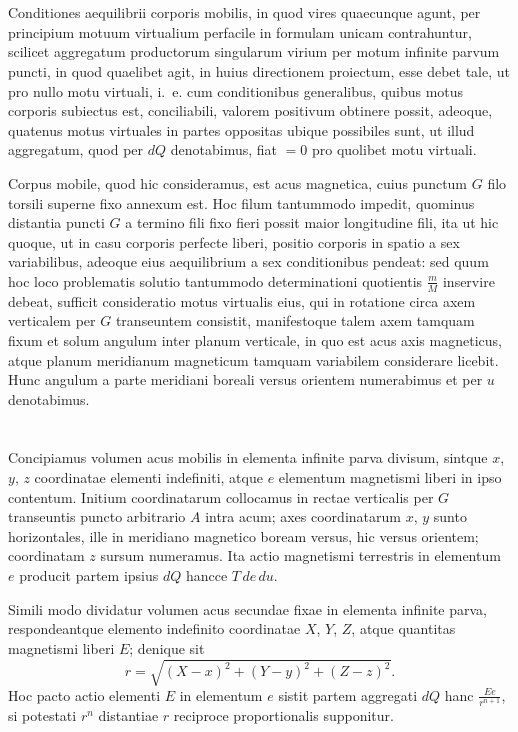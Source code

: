 \documentclass[fontsize=11pt,paper=a4,twoside,openany]{scrbook}
\begin{document}
\section{}

Conditiones aequilibrii corporis mobilis, in quod vires quaecunque agunt, per principium motuum virtualium perfacile in formulam unicam contrahuntur, scilicet aggregatum productorum singularum virium per motum infinite parvum puncti, in quod quaelibet agit, in huius directionem proiectum, esse debet tale, ut pro nullo motu virtuali, i.~e. cum conditionibus generalibus, quibus motus corporis subiectus est, conciliabili, valorem positivum obtinere possit, adeoque, quatenus motus virtuales in partes oppositas ubique possibiles sunt, ut illud aggregatum, quod per $dQ$ denotabimus, fiat $=0$ pro quolibet motu virtuali.

Corpus mobile, quod hic consideramus, est acus magnetica, cuius punctum $G$ filo torsili superne fixo annexum est. Hoc filum tantummodo impedit, quominus distantia puncti $G$ a termino fili fixo fieri possit maior longitudine fili, ita ut hic quoque, ut in casu corporis perfecte liberi, positio corporis in spatio a sex variabilibus, adeoque eius aequilibrium a sex conditionibus pendeat: sed quum hoc loco problematis solutio tantummodo determinationi quotientis $\frac{m}{M}$ inservire debeat, sufficit consideratio motus virtualis eius, qui in rotatione circa axem verticalem per $G$ transeuntem consistit, manifestoque talem axem tamquam fixum et solum angulum inter planum verticale, in quo est acus axis magneticus, atque planum meridianum magneticum tamquam variabilem considerare licebit. Hunc angulum a parte meridiani boreali versus orientem numerabimus et per $u$ denotabimus.

\section{}

Concipiamus volumen acus mobilis in elementa infinite parva divisum, sintque $x$, $y$, $z$ coordinatae elementi indefiniti, atque $e$ elementum magnetismi liberi in ipso contentum. Initium coordinatarum collocamus in rectae verticalis per $G$ transeuntis puncto arbitrario $A$ intra acum; axes coordinatarum $x$, $y$ sunto horizontales, ille in meridiano magnetico boream versus, hic versus orientem; coordinatam $z$ sursum numeramus. Ita actio magnetismi terrestris in elementum $e$ producit partem ipsius $dQ$ hancce $T\,de\,du$.

Simili modo dividatur volumen acus secundae fixae in elementa infinite parva, respondeantque elemento indefinito coordinatae $X$, $Y$, $Z$, atque quantitas magnetismi liberi $E$; denique sit
\[
r = \sqrt{(X-x)^2+(Y-y)^2+(Z-z)^2}.
\]
Hoc pacto actio elementi $E$ in elementum $e$ sistit partem aggregati $dQ$ hanc $\frac{Ee}{r^{n+1}}$, si potestati $r^n$ distantiae $r$ reciproce proportionalis supponitur.
\end{document}
